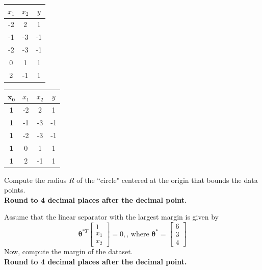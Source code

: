 \documentclass[11pt,addpoints,answers]{exam}
\newcommand{\thetav     }{\boldsymbol \theta     }
\begin{document}
\begin{questions}
\begin{parts}
    \begin{center}
    \begin{tabular}{||c c c||}
        \hline
         $x_1$ & $x_2$ & $y$ \\ [0.5ex]
        \hline\hline
        -2 & 2 & 1 \\
        \hline
        -1 & -3 & -1 \\
        \hline
        -2 & -3 & -1 \\
        \hline
        0 & 1 & 1 \\
        \hline
        2 & -1 & 1 \\
        \hline
    \end{tabular}
    \hspace{4em}
    \begin{tabular}{||c c c c||}
        \hline
        $\bm{x_0}$ & $x_1$ & $x_2$ & $y$ \\ [0.5ex]
        \hline\hline
        \textbf{1} & -2 & 2 & 1 \\
        \hline
        \textbf{1} & -1 & -3 & -1 \\
        \hline
        \textbf{1} & -2 & -3 & -1 \\
        \hline
        \textbf{1} & 0 & 1 & 1 \\
        \hline
        \textbf{1} & 2 & -1 & 1 \\
        \hline
    \end{tabular}
    \end{center}
    
    \begin{subparts}
        \subpart[2] Compute the radius $R$ of the ``circle" centered at the origin that bounds the data points. \\
        \textbf{Round to 4 decimal places after the decimal point.}
        
        \begin{your_solution}[title=Radius:,height=2cm,width=5cm]
        \end{your_solution}
        
        
        
        \subpart[2] Assume that the linear separator with the largest margin is given by \[\thetav^{*T}\begin{bmatrix}
        1 \\
        x_1 \\
        x_2 
        \end{bmatrix} = 0, \text{, where } \thetav^* = \begin{bmatrix}
        6 \\
        3 \\
        4 
        \end{bmatrix}
        \]
        Now, compute the margin of the dataset.\\
        \textbf{Round to 4 decimal places after the decimal point.}
        

\end{subparts}
\end{parts}
\end{questions}
\end{document}
